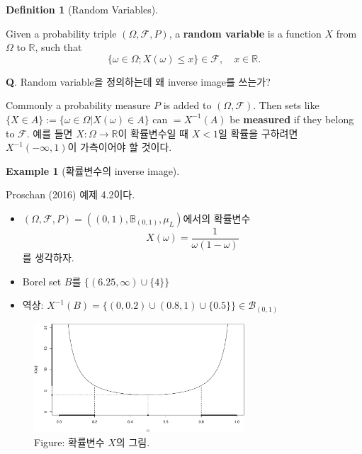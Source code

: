 \documentclass[
  13pt,
  letterpaper,
  DIV=11,
  numbers=noendperiod]{scrreprt}
\theoremstyle{plain}
\theoremstyle{definition}
\newtheorem{example}{Example}[chapter]
\theoremstyle{definition}
\newtheorem{definition}{Definition}[chapter]
\theoremstyle{plain}
\theoremstyle{definition}
\theoremstyle{plain}
\theoremstyle{remark}
\begin{document}
\begin{definition}[Random
Variables]\protect\hypertarget{def-rvs}{}\label{def-rvs}

Given a probability triple \((\Omega, \mathcal{F}, P)\), a
\textbf{random variable} is a function \(X\) from \(\Omega\) to
\(\mathbb{R}\), such that \[
\{ \omega \in \Omega; X(\omega) \leq x  \} \in \mathcal{F} ,\quad{} x \in \mathbb{R}.
\]

\end{definition}

\textbf{Q}. Random variable을 정의하는데 왜 inverse image를 쓰는가?

Commonly a probability measure \(P\) is added to
\((\Omega, \mathcal{F})\). Then sets like
\(\{X \in A\}:= \{\omega \in \Omega | X(\omega) \in A\}\) can
\(=X^{-1}(A)\) be \textbf{measured} if they belong to \(\mathcal{F}\).
예를 들면 \(X: \Omega \rightarrow \mathbb{R}\)이 확률변수일 때 \(X<1\)일
확률을 구하려면 \(X^{-1}(-\infty, 1)\)이 가측이어야 할 것이다.

\begin{example}[확률변수의 inverse
image]\protect\hypertarget{exm-rvs}{}\label{exm-rvs}

Proschan (2016) 예제 4.2이다.

\begin{itemize}
\item
  \((\Omega, \mathcal{F}, P) = ((0,1),\mathbb{B}_{(0,1)}, \mu_L)\)에서의
  확률변수 \[
  X(\omega) = \frac{1}{\omega (1-\omega)}
  \] 를 생각하자.
\item
  Borel set \(B\)를 \(\{ (6.25, \infty) \cup \{4\}\}\)
\item
  역상:
  \(X^{-1}(B) = \{ (0,0.2) \cup (0.8,1) \cup \{0.5\} \} \in \mathcal{B}_{(0,1)}\)
\end{itemize}

\begin{figure}[th]

{\centering \includegraphics[width=0.7\textwidth,height=\textheight]{rvs_files/figure-pdf/unnamed-chunk-2-1.pdf}

}

\caption{Figure: 확률변수 \(X\)의 그림.}

\end{figure}%

\end{example}
\end{document}
